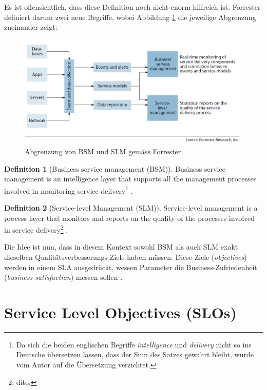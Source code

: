 \documentclass[11pt,listof=totoc]{scrreprt} %
\theoremstyle{definition}
\newtheorem{definition}{Definition}
\begin{document}
Es ist offensichtlich, dass diese Definition noch nicht enorm hilfreich ist. Forrester definiert darum zwei neue Begriffe, wobei Abbildung \ref{forr} die jeweilige Abgrenzung zueinander zeigt:

\begin{figure}
\label{forr}
\caption{Abgrenzung von BSM und SLM gemäss Forrester}
\includegraphics[scale=0.47]{biltli/forrester_bsm_slm.png}
\end{figure}

\begin{definition}[Business service management (BSM)] Business service management is an intelligence layer that supports all the management processes involved in monitoring service delivery\footnote{Da sich die beiden englischen Begriffe {\em intelligence} und {\em delivery} nicht so ins Deutsche übersetzen lassen, dass der Sinn des Satzes gewahrt bleibt, wurde vom Autor auf die Übersetzung verzichtet.} \cite{forrester:slaBestPractices}.
\end{definition}

\begin{definition}[Service-level Management (SLM)]
Service-level management is a process layer that monitors and reports on the quality of
the processes involved in service delivery\footnote{dito.} \cite{forrester:slaBestPractices}.
\end{definition}

Die Idee ist nun, dass in diesem Kontext sowohl BSM als auch SLM exakt dieselben Qualitätsverbesserungs-Ziele haben müssen. Diese Ziele ({\em objectives}) werden in einem SLA ausgedrückt, wessen Parameter die Business-Zufriedenheit ({\em business satisfaction}) messen sollen \cite{forrester:slaBestPractices, EllisKauferstein200311}.

\section{Service Level Objectives (SLOs)}
\end{document}
